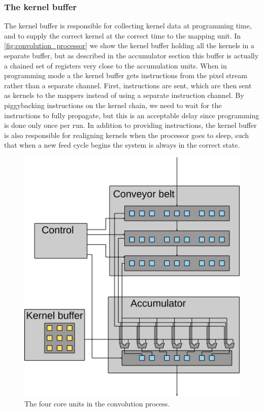 \subsubsection{The kernel buffer}
The kernel buffer is responsible for collecting kernel data at programming time, and to supply the correct kernel at the correct time to the mapping unit.
In \ref{fig:convolution_processor} we show the kernel buffer holding all the kernels in a separate buffer, but as described in the accumulator section this buffer is actually a chained set of registers very close to the accumulation units.
When in programming mode a the kernel buffer gets instructions from the pixel stream rather than a separate channel.
First, instructions are sent, which are then sent as kernels to the mappers instead of using a separate instruction channel.
By piggybacking instructions on the kernel chain, we need to wait for the instructions to fully propagate, but this is an acceptable delay since programming is done only once per run.
In addition to providing instructions, the kernel buffer is also responsible for realigning kernels when the processor goes to sleep, such that when a new feed cycle begins the system is always in the correct state.


\begin{figure}[h!]
    \includegraphics[width=\linewidth]{img/processor_overview.png}
    \caption{The four core units in the convolution process.}
    \label{fig:processor_core}
\end{figure}

